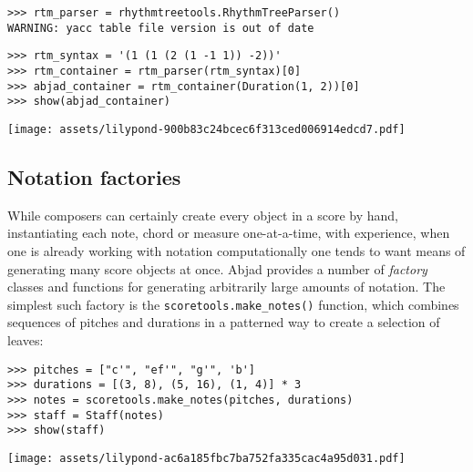 \begin{abjadbookoutput}
\begin{singlespacing}
\vspace{-0.5\baselineskip}
\begin{verbatim}
>>> rtm_parser = rhythmtreetools.RhythmTreeParser()
WARNING: yacc table file version is out of date
\end{verbatim}
\begin{verbatim}
>>> rtm_syntax = '(1 (1 (2 (1 -1 1)) -2))'
>>> rtm_container = rtm_parser(rtm_syntax)[0]
>>> abjad_container = rtm_container(Duration(1, 2))[0]
>>> show(abjad_container)
\end{verbatim}
\noindent\texttt{[image: assets/lilypond-900b83c24bcec6f313ced006914edcd7.pdf]}
\end{singlespacing}
\end{abjadbookoutput}

\subsection{Notation factories}
\label{ssec:notation-factories}

While composers can certainly create every object in a score by hand,
instantiating each note, chord or measure one-at-a-time, with experience, when
one is already working with notation computationally one tends to want means of
generating many score objects at once. Abjad provides a number of
\emph{factory} classes and functions for generating arbitrarily large amounts
of notation. The simplest such factory is the \texttt{scoretools.make\_notes()}
function, which combines sequences of pitches and durations in a patterned way
to create a selection of leaves:

\begin{comment}
<abjad>
pitches = ["c'", "ef'", "g'", 'b']
durations = [(3, 8), (5, 16), (1, 4)] * 3
notes = scoretools.make_notes(pitches, durations)
staff = Staff(notes)
show(staff)
</abjad>
\end{comment}

\begin{abjadbookoutput}
\begin{singlespacing}
\vspace{-0.5\baselineskip}
\begin{verbatim}
>>> pitches = ["c'", "ef'", "g'", 'b']
>>> durations = [(3, 8), (5, 16), (1, 4)] * 3
>>> notes = scoretools.make_notes(pitches, durations)
>>> staff = Staff(notes)
>>> show(staff)
\end{verbatim}
\noindent\texttt{[image: assets/lilypond-ac6a185fbc7ba752fa335cac4a95d031.pdf]}
\end{singlespacing}
\end{abjadbookoutput}

